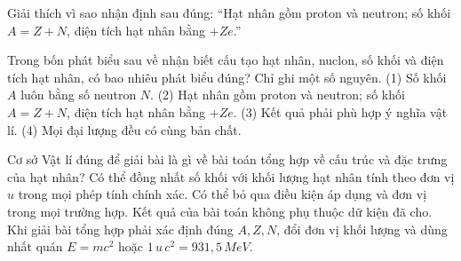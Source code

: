 \begin{bt}
Giải thích vì sao nhận định sau đúng: “Hạt nhân gồm proton và neutron; số khối $A=Z+N$, điện tích hạt nhân bằng $+Ze$.”
\end{bt}

\begin{ex}
Trong bốn phát biểu sau về nhận biết cấu tạo hạt nhân, nuclon, số khối và điện tích hạt nhân, có bao nhiêu phát biểu đúng? Chỉ ghi một số nguyên. (1) Số khối $A$ luôn bằng số neutron $N$. (2) Hạt nhân gồm proton và neutron; số khối $A=Z+N$, điện tích hạt nhân bằng $+Ze$. (3) Kết quả phải phù hợp ý nghĩa vật lí. (4) Mọi đại lượng đều có cùng bản chất.
\end{ex}

\begin{ex}
Cơ sở Vật lí đúng để giải bài là gì về bài toán tổng hợp về cấu trúc và đặc trưng của hạt nhân?
\choice
{Có thể đồng nhất số khối với khối lượng hạt nhân tính theo đơn vị $u$ trong mọi phép tính chính xác.}
{Có thể bỏ qua điều kiện áp dụng và đơn vị trong mọi trường hợp.}
{Kết quả của bài toán không phụ thuộc dữ kiện đã cho.}
{\True Khi giải bài tổng hợp phải xác định đúng $A,Z,N$, đổi đơn vị khối lượng và dùng nhất quán $E=mc^2$ hoặc $1\,u\,c^2=931,5\,MeV$.}
\end{ex}

